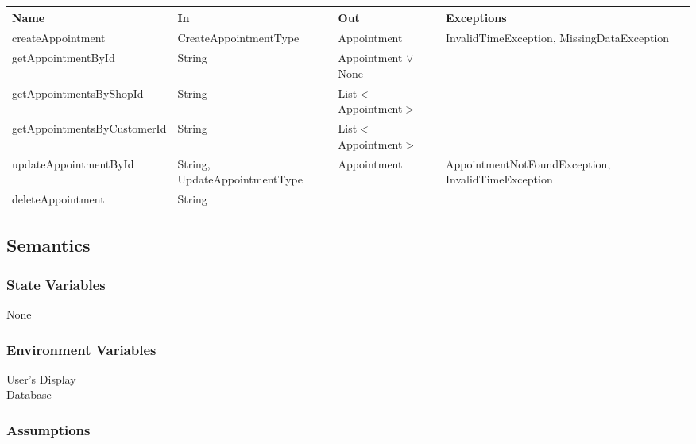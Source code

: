 \documentclass[12pt, titlepage]{article}
\begin{document}
\begin{center}
	\begin{adjustbox}{width=\textwidth}
		\begin{tabular}{llll}
			\hline
			\textbf{Name}               & \textbf{In}                   & \textbf{Out}            & \textbf{Exceptions}                                \\
			\hline
			createAppointment           & CreateAppointmentType         & Appointment             & InvalidTimeException, MissingDataException         \\
			getAppointmentById          & String                        & Appointment $\lor$ None & ~                                                  \\
			getAppointmentsByShopId     & String                        & List$<$Appointment$>$   & ~                                                  \\
			getAppointmentsByCustomerId & String                        & List$<$Appointment$>$   & ~                                                  \\
			updateAppointmentById       & String, UpdateAppointmentType & Appointment             & AppointmentNotFoundException, InvalidTimeException \\
			deleteAppointment           & String                        & ~                       & ~                                                  \\
			\hline
		\end{tabular}
	\end{adjustbox}
\end{center}

\subsection{Semantics}

\subsubsection{State Variables}

None

\subsubsection{Environment Variables}

User's Display \\ Database

\subsubsection{Assumptions}
\end{document}
